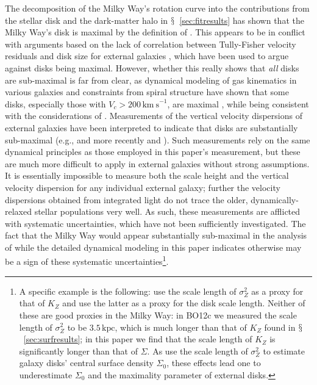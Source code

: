 \documentclass{emulateapj}
\newcommand{\eg}{e.g.}
\newcommand{\sectionname}{$\mathsection$}
\newcommand{\kpc}{\ensuremath{\,\mathrm{kpc}}}
\newcommand{\kms}{\ensuremath{\,\mathrm{km\ s}^{-1}}}
\newcommand{\bo}{BO12}
\begin{document}
The decomposition of the Milky Way's rotation curve into the
contributions from the stellar disk and the dark-matter halo in
\sectionname~\ref{sec:fitresults} has shown that the Milky Way's disk
is maximal by the definition of \citet{Sackett97a}. This appears to be
in conflict with arguments based on the lack of correlation between
Tully-Fisher velocity residuals and disk size for external galaxies
\citep{Courteau99a}, which have been used to argue against disks being
maximal. However, whether this really shows that \emph{all} disks are
sub-maximal is far from clear, as dynamical modeling of gas kinematics
in various galaxies and constraints from spiral structure have shown
that some disks, especially those with $V_c > 200\kms$, are maximal
\citep{Atha87a,Weiner01a,Kranz03a}, while being consistent with the
considerations of \citet{Courteau99a}. Measurements of the vertical
velocity dispersions of external galaxies have been interpreted to
indicate that disks are substantially sub-maximal (\eg,
\citealt{Bottema97a} and more recently \citealt{Kregel05a} and
\citealt{Bershady11a}). Such measurements rely on the same dynamical
principles as those employed in this paper's measurement, but these
are much more difficult to apply in external galaxies without strong
assumptions. It is essentially impossible to measure both the scale
height and the vertical velocity dispersion for any individual
external galaxy; further the velocity dispersions obtained from
integrated light do not trace the older, dynamically-relaxed stellar
populations very well. As such, these measurements are afflicted with
systematic uncertainties, which have not been sufficiently
investigated. The fact that the Milky Way would appear substantially
sub-maximal in the analysis of \citet{Bershady11a} while the detailed
dynamical modeling in this paper indicates otherwise may be a sign of
these systematic uncertainties\footnote{A specific example is the
  following: \citet{Bershady11a} use the scale length of $\sigma_Z^2$
  as a proxy for that of $K_Z$ and use the latter as a proxy for the
  disk scale length. Neither of these are good proxies in the Milky
  Way: in \bo c we measured the scale length of $\sigma_Z^2$ to be
  $3.5\kpc$, which is much longer than that of $K_Z$ found in
  \sectionname~\ref{sec:surfresults}; in this paper we find that the
  scale length of $K_Z$ is significantly longer than that of
  $\Sigma$. As \citet{Bershady11a} use the scale length of
  $\sigma_Z^2$ to estimate galaxy disks' central surface density
  $\Sigma_0$, these effects lead one to underestimate $\Sigma_0$ and
  the maximality parameter of external disks.}.
\end{document}
